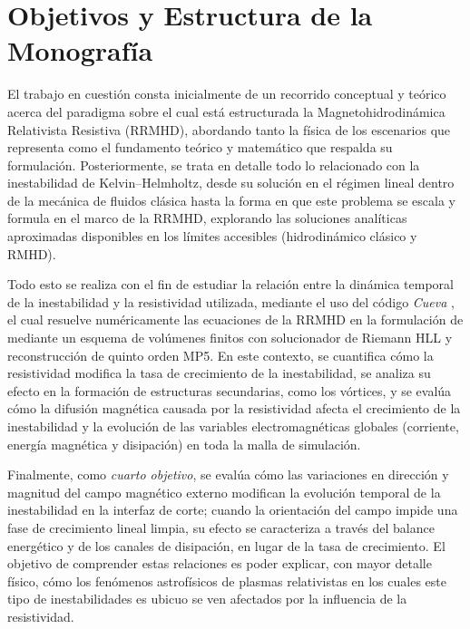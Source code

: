 \section{Objetivos y Estructura de la Monografía}

\primerparrafo El trabajo en cuestión consta inicialmente de un recorrido conceptual y teórico acerca del paradigma sobre el cual está estructurada la Magnetohidrodinámica Relativista Resistiva (RRMHD), abordando tanto la física de los escenarios que representa como el fundamento teórico y matemático que respalda su formulación. Posteriormente, se trata en detalle todo lo relacionado con la inestabilidad de Kelvin--Helmholtz, desde su solución en el régimen lineal dentro de la mecánica de fluidos clásica hasta la forma en que este problema se escala y formula en el marco de la RRMHD, explorando las soluciones analíticas aproximadas disponibles en los límites accesibles (hidrodinámico clásico y RMHD).

Todo esto se realiza con el fin de estudiar la relación entre la dinámica temporal de la inestabilidad y la resistividad utilizada, mediante el uso del código \textit{Cueva} \parencite{miranda-aranguren-2018}, el cual resuelve numéricamente las ecuaciones de la RRMHD en la formulación de \textcite{komissarov-2007} mediante un esquema de volúmenes finitos con solucionador de Riemann HLL y reconstrucción de quinto orden MP5. En este contexto, se cuantifica cómo la resistividad modifica la tasa de crecimiento de la inestabilidad, se analiza su efecto en la formación de estructuras secundarias, como los vórtices, y se evalúa cómo la difusión magnética causada por la resistividad afecta el crecimiento de la inestabilidad y la evolución de las variables electromagnéticas globales (corriente, energía magnética y disipación) en toda la malla de simulación.

Finalmente, como \emph{cuarto objetivo}, se evalúa cómo las variaciones en dirección y magnitud del campo magnético externo modifican la evolución temporal de la inestabilidad en la interfaz de corte; cuando la orientación del campo impide una fase de crecimiento lineal limpia, su efecto se caracteriza a través del balance energético y de los canales de disipación, en lugar de la tasa de crecimiento. El objetivo de comprender estas relaciones es poder explicar, con mayor detalle físico, cómo los fenómenos astrofísicos de plasmas relativistas en los cuales este tipo de inestabilidades es ubicuo se ven afectados por la influencia de la resistividad.